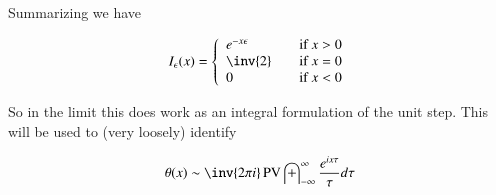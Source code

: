 \documentclass{article}
\DeclareMathOperator{\PV}{PV}
\newcommand{\IIinf}[0]{ \int_{-\infty}^\infty }
\begin{document}
Summarizing we have

\begin{align*}
I_\epsilon(x) =
\left\{
\begin{array}{l l}
e^{-x\epsilon} & \quad \mbox{if $x > 0$} \\
\inv{2} & \quad \mbox{if $x = 0$} \\
0 & \quad \mbox{if $x < 0$} \\
\end{array}
\right.
\end{align*}

So in the limit this does work as an integral formulation of the unit step.  This will be used to (very loosely) identify

\begin{align}\label{eqn:heavysideUnitIntegral}
\theta(x) \sim \inv{2\pi i} \PV \IIinf \frac{e^{ix\tau}}{\tau} d\tau
\end{align}



\end{document}
